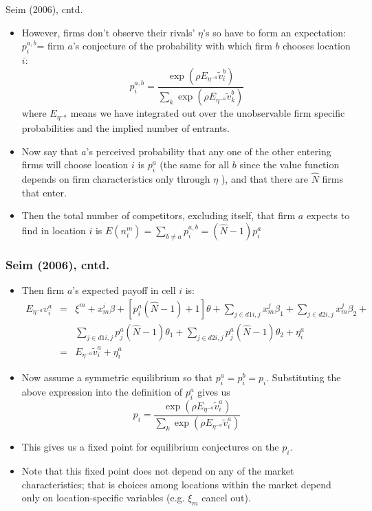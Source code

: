 \begin{frame}{Seim (2006), cntd.}
\footnotesize
\begin{itemize}
\item However, firms don't observe their rivals' $\eta $'s so have to form
an expectation:\ $p_{i}^{a,b}$= firm $a$'s conjecture of the probability
with which firm $b$ chooses location $i$:%
\begin{equation*}
p_{i}^{a,b}=\frac{\exp (\rho E_{\eta ^{-a}}\tilde{v}_{i}^{b})}{\sum_{k}\exp
(\rho E_{\eta ^{-a}}\tilde{v}_{k}^{b})}
\end{equation*}%
where $E_{\eta ^{-a}}$ means we have integrated out over the unobservable
firm specific probabilities and the implied number of entrants.

\item Now say that $a$'s perceived probability that any one of the other
entering firms will choose location $i$ is $p_{i}^{a}$ (the same for all $b$
since the value function depends on firm characteristics only through $\eta $%
), and that there are $\hat{N}$ firms that enter.

\item Then the total number of competitors, excluding itself, that firm $a$
expects to find in location $i$ is $E(n_{i}^{m})=\sum_{b\neq a}p_{i}^{a,b}=(%
\hat{N}-1)p_{i}^{a}$
\end{itemize}
\end{frame}

\begin{frame}
\frametitle{Seim (2006), cntd.}
\footnotesize
\begin{itemize}
\item Then firm $a$'s expected payoff in cell $i$ is: 
\begin{eqnarray*}
E_{\eta ^{-a}}v_{i}^{a} &=&\xi ^{m}+x_{m}^{i}\beta +[p_{i}^{a}(\hat{N}%
-1)+1]\theta +\sum_{j\in d1i,j}x_{m}^{j}\beta _{1}+\sum_{j\in
d2i,j}x_{m}^{j}\beta _{2}+ \\
&&\sum_{j\in d1i,j}p_{j}^{a}(\hat{N}-1)\theta _{1}+\sum_{j\in
d2i,j}p_{j}^{a}(\hat{N}-1)\theta _{2}+\eta _{i}^{a} \\
&=&E_{\eta ^{-a}}\tilde{v}_{i}^{a}+\eta _{i}^{a}
\end{eqnarray*}

\item Now assume a symmetric equilibrium so that $p_{i}^{a}=p_{i}^{b}=p_{i}.$
Substituting the above expression into the definition of $p_{i}^{a}$ gives
us 
\begin{equation*}
p_{i}=\frac{\exp (\rho E_{\eta ^{-a}}\tilde{v}_{i}^{a})}{\sum_{k}\exp (\rho
E_{\eta ^{-a}}\tilde{v}_{i}^{a})}
\end{equation*}

\item This gives us a fixed point for equilibrium conjectures on the $p_{i}$.

\item Note that this fixed point does not depend on any of the market
characteristics; that is choices among locations within the market depend
only on location-specific variables (e.g. $\xi _{m}$ cancel out).
\end{itemize}
\end{frame}


